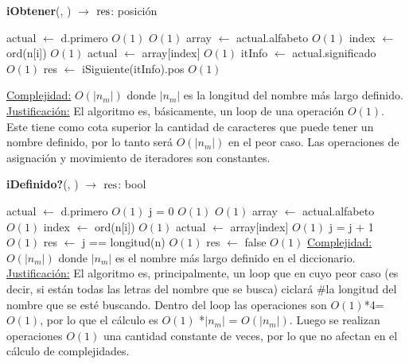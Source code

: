 \begin{Algoritmos}
\begin{algorithm}[H]{\textbf{iObtener}(, ) $\to$ $\res$: posici\'on}
	\begin{algorithmic}
    \State actual $\gets$ d.primero \Comment $O(1)$
 \Comment $O(1)$
	\State array $\gets$ actual.alfabeto  \Comment $O(1)$
   	\State index $\gets$ ord(n[i]) \Comment $O(1)$
	\State actual $\gets$ array[index] \Comment $O(1)$
\EndFor
	\State itInfo $\gets$ actual.significado \Comment $O(1)$
	\State res $\gets$ iSiguiente(itInfo).pos \Comment $O(1)$

    \Statex \underline{Complejidad:} $O(|n_{m}|)$ donde $|n_{m}|$ es la longitud del nombre más largo definido.
    \Statex \underline{Justificación:} El algoritmo es, básicamente, un loop de una operación $O(1)$. Este tiene como cota superior la cantidad de caracteres que puede tener un nombre definido, por lo tanto será $O(|n_{m}|)$ en el peor caso. Las operaciones de asignación y movimiento de iteradores son constantes.
    \end{algorithmic}
\end{algorithm}

\begin{algorithm}[H]{\textbf{iDefinido?}(, ) $\to$ $\res$: bool}
	\begin{algorithmic}
    \State actual $\gets$ d.primero \Comment $O(1)$
    \State j = 0 \Comment $O(1)$
 \Comment $O(1)$
	\State array $\gets$ actual.alfabeto  \Comment $O(1)$
   	\State index $\gets$ ord(n[i]) \Comment $O(1)$
	\State actual $\gets$ array[index] \Comment $O(1)$
    \State j = j + 1
\EndFor
	 \Comment $O(1)$
    \State res $\gets$ j == longitud(n) \Comment $O(1)$
   	\Else 
    \State res $\gets$ false \Comment $O(1)$
    \EndIf
    \Statex \underline{Complejidad:} $O(|n_{m}|)$ donde $|n_{m}|$ es el nombre más largo definido en el diccionario.
    \Statex \underline{Justificación:} El algoritmo es, principalmente, un loop que en cuyo peor caso (es decir, si están todas las letras del nombre que se busca) ciclará $\#$la longitud del nombre que se esté buscando. Dentro del loop las operaciones son $O(1)$*4=$O(1)$, por lo que el cálculo es $O(1)$ *$|n_{m}|$ = $O(|n_{m}|)$. Luego se realizan operaciones $O(1)$ una cantidad constante de veces, por lo que no afectan en el cálculo de complejidades. 
	\end{algorithmic}
\end{algorithm}


\end{Algoritmos}
